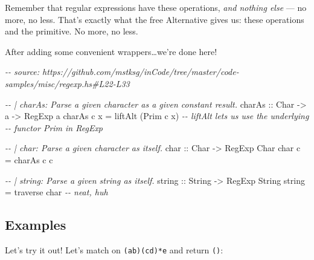 \documentclass[]{article}
\newenvironment{Shaded}{}{}
\newcommand{\CharTok}[1]{\textcolor[rgb]{0.25,0.44,0.63}{#1}}
\newcommand{\CommentTok}[1]{\textcolor[rgb]{0.38,0.63,0.69}{\textit{#1}}}
\newcommand{\DataTypeTok}[1]{\textcolor[rgb]{0.56,0.13,0.00}{#1}}
\newcommand{\FunctionTok}[1]{\textcolor[rgb]{0.02,0.16,0.49}{#1}}
\newcommand{\NormalTok}[1]{#1}
\newcommand{\OperatorTok}[1]{\textcolor[rgb]{0.40,0.40,0.40}{#1}}
\newcommand{\OtherTok}[1]{\textcolor[rgb]{0.00,0.44,0.13}{#1}}
\newcommand{\StringTok}[1]{\textcolor[rgb]{0.25,0.44,0.63}{#1}}
\begin{document}
Remember that regular expressions have these operations, \emph{and nothing else}
--- no more, no less. That's exactly what the free Alternative gives us: these
operations and the primitive. No more, no less.

After adding some convenient wrappers\ldots we're done here!

\begin{Shaded}
\begin{Highlighting}[]
\CommentTok{{-}{-} source: https://github.com/mstksg/inCode/tree/master/code{-}samples/misc/regexp.hs\#L22{-}L33}

\CommentTok{{-}{-} | charAs: Parse a given character as a given constant result.}
\OtherTok{charAs ::} \DataTypeTok{Char} \OtherTok{{-}>}\NormalTok{ a }\OtherTok{{-}>} \DataTypeTok{RegExp}\NormalTok{ a}
\NormalTok{charAs c x }\OtherTok{=}\NormalTok{ liftAlt (}\DataTypeTok{Prim}\NormalTok{ c x)     }\CommentTok{{-}{-} liftAlt lets us use the underlying}
                                    \CommentTok{{-}{-} functor Prim in RegExp}

\CommentTok{{-}{-} | char: Parse a given character as itself.}
\OtherTok{char ::} \DataTypeTok{Char} \OtherTok{{-}>} \DataTypeTok{RegExp} \DataTypeTok{Char}
\NormalTok{char c }\OtherTok{=}\NormalTok{ charAs c c}

\CommentTok{{-}{-} | string: Parse a given string as itself.}
\OtherTok{string ::} \DataTypeTok{String} \OtherTok{{-}>} \DataTypeTok{RegExp} \DataTypeTok{String}
\NormalTok{string }\OtherTok{=} \FunctionTok{traverse}\NormalTok{ char              }\CommentTok{{-}{-} neat, huh}
\end{Highlighting}
\end{Shaded}

\hypertarget{examples}{%
\subsection{Examples}\label{examples}}

Let's try it out! Let's match on \texttt{(a\textbar{}b)(cd)*e} and return
\texttt{()}:

\begin{Shaded}
\end{Shaded}
\end{document}

